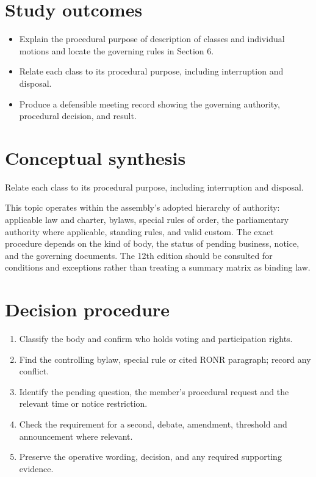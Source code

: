 \documentclass[11pt]{article}
\begin{document}
\SuiteOpen
{}
\section{Study outcomes}
\begin{itemize}[leftmargin=*,itemsep=4pt]
\item Explain the procedural purpose of description of classes and individual motions and locate the governing rules in Section 6.
\item Relate each class to its procedural purpose, including interruption and disposal.
\item Produce a defensible meeting record showing the governing authority, procedural decision, and result.
\end{itemize}

\section{Conceptual synthesis}
Relate each class to its procedural purpose, including interruption and disposal.

This topic operates within the assembly’s adopted hierarchy of authority: applicable law and charter, bylaws, special rules of order, the parliamentary authority where applicable, standing rules, and valid custom. The exact procedure depends on the kind of body, the status of pending business, notice, and the governing documents. The 12th edition should be consulted for conditions and exceptions rather than treating a summary matrix as binding law.
\section{Decision procedure}
\begin{enumerate}[leftmargin=*,itemsep=4pt]
\item Classify the body and confirm who holds voting and participation rights.
\item Find the controlling bylaw, special rule or cited RONR paragraph; record any conflict.
\item Identify the pending question, the member’s procedural request and the relevant time or notice restriction.
\item Check the requirement for a second, debate, amendment, threshold and announcement where relevant.
\item Preserve the operative wording, decision, and any required supporting evidence.
\end{enumerate}
\end{document}
